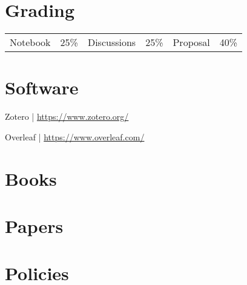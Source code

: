 \documentclass[11pt,article,oneside]{memoir}
\begin{document}
\section{Grading}
%
\begin{table}[H]
\begin{tabular}{l l @{\hskip 2cm} l @{\hskip 0.5cm} l @{\hskip 2cm} l @{\hskip 0.5cm} l}
%
Notebook & 25\% & Discussions & 25\% &   Proposal & 40\% \\
%
\end{tabular}
\end{table}


\section{Software}
\begin{minipage}{0.48\textwidth}
Zotero | \url{https://www.zotero.org/}\\
\end{minipage}
\hfill
\begin{minipage}{0.48\textwidth}
Overleaf | \url{https://www.overleaf.com/}\\
\end{minipage}

\section{Books}
\vspace*{0.5cm}
\nocite{*}
\setlength{}
\printbibliography[type=book, heading=none]

\section{Papers}
\vspace*{0.5cm}
\nocite{*}
\setlength{}
\printbibliography[type=article, heading=none]

\section{Policies}
\end{document}
